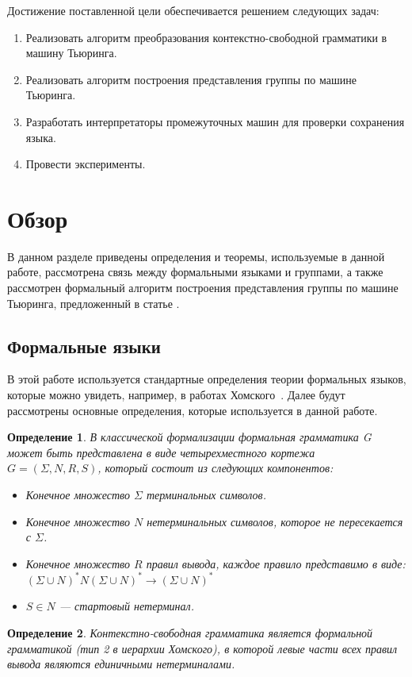 \documentclass[14pt]{matmex-diploma-custom}
\newtheorem{defn}{Определение}[subsection]
\begin{document}
Достижение поставленной цели обеспечивается решением следующих задач:
    \begin{enumerate}
    \item Реализовать алгоритм преобразования контекстно-свободной грамматики в машину Тьюринга.
    \item Реализовать алгоритм построения представления группы по машине Тьюринга.
    \item Разработать интерпретаторы промежуточных машин для проверки сохранения языка.
    \item Провести эксперименты.
\end{enumerate}

\section{Обзор}
В данном разделе приведены определения и теоремы, используемые в данной работе, рассмотрена связь между формальными языками и группами, а также рассмотрен формальный алгоритм построения представления группы по машине Тьюринга, предложенный в статье \cite{Sapir}.

\subsection{Формальные языки}
В этой работе используется стандартные определения теории формальных языков, которые можно увидеть,
например, в работах Хомского~\cite{chomsky1, chomsky2}. 
Далее будут рассмотрены основные определения, которые используется в данной работе. 

\begin{defn}
В классической формализации формальная грамматика G может быть представлена 
в виде четырехместного кортежа $G = (\Sigma, N, R, S)$, который состоит из следующих компонентов:
\begin{itemize}
    \item Конечное множество $\Sigma$ терминальных символов.
    \item Конечное множество $N$ нетерминальных символов, которое не пересекается с $\Sigma$.
    \item Конечное множество $R$ правил вывода, каждое правило представимо в виде: 
    $(\Sigma \cup N)^{*}N(\Sigma \cup N)^{*} \to (\Sigma \cup N)^{*}$
    \item $S \in N$ --- стартовый нетерминал.
\end{itemize}
\end{defn}

\begin{defn}
Контекстно-свободная грамматика является формальной грамматикой
(тип 2 в иерархии Хомского), в которой левые части всех правил вывода 
являются единичными нетерминалами. 
\end{defn}
\end{document}

